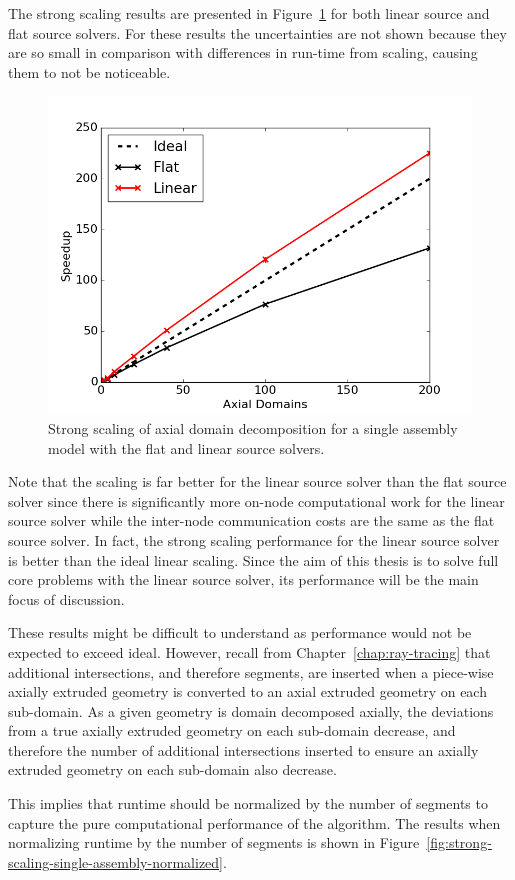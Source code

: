 The strong scaling results are presented in Figure~\ref{fig:strong-scaling-single-assembly-ts} for both linear source and flat source solvers. For these results the uncertainties are not shown because they are so small in comparison with differences in run-time from scaling, causing them to not be noticeable.
\begin{figure}[h!]
	\centering
	\includegraphics[width=0.7\linewidth]{figures/DD/sa-scaling-fs-ls-ts.png}
	\caption[]{Strong scaling of axial domain decomposition for a single assembly model with the flat and linear source solvers.}
	\label{fig:strong-scaling-single-assembly-ts}
\end{figure}

Note that the scaling is far better for the linear source solver than the flat source solver since there is significantly more on-node computational work for the linear source solver while the inter-node communication costs are the same as the flat source solver. In fact, the strong scaling performance for the linear source solver is better than the ideal linear scaling. Since the aim of this thesis is to solve full core problems with the linear source solver, its performance will be the main focus of discussion.

These results might be difficult to understand as performance would not be expected to exceed ideal. However, recall from Chapter~\ref{chap:ray-tracing} that additional intersections, and therefore segments, are inserted when a piece-wise axially extruded geometry is converted to an axial extruded geometry on each sub-domain. As a given geometry is domain decomposed axially, the deviations from a true axially extruded geometry on each sub-domain decrease, and therefore the number of additional intersections inserted to ensure an axially extruded geometry on each sub-domain also decrease.

This implies that runtime should be normalized by the number of segments to capture the pure computational performance of the algorithm. The results when normalizing runtime by the number of segments is shown in Figure~\ref{fig:strong-scaling-single-assembly-normalized}. 

